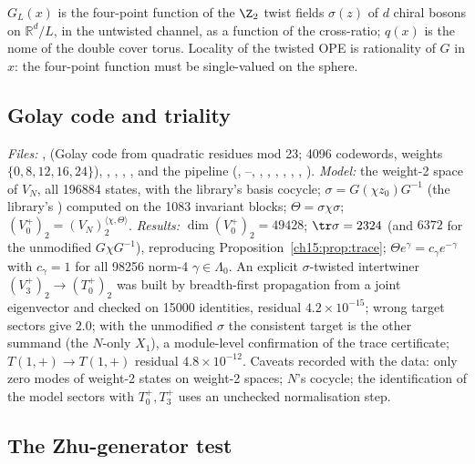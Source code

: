 \begin{physics}
$G_L(x)$ is the four-point function of the $\Z_2$ twist fields $\sigma(z)$ of $d$ chiral bosons
on $\mathbb{R}^d/L$, in the untwisted channel, as a function of the cross-ratio; $q(x)$ is the nome of the
double cover torus. Locality of the twisted OPE is rationality of $G$ in $x$: the four-point
function must be single-valued on the sphere.
\end{physics}

\subsection{Golay code and triality}\label{ch15:sec:num-triality}

\emph{Files:} ,  (Golay code from quadratic residues mod 23;
4096 codewords, weights $\{0,8,12,16,24\}$), , , ,
, and the pipeline  (, --,
, , , , , ,
). \emph{Model:} the weight-2 space of $V_N$, all 196884 states, with the library's
basis cocycle; $\sigma=G(\chi z_0)G^{-1}$ (the library's ) computed on the 1083
invariant blocks; $\Theta=\sigma\chi\sigma$; $(V_0^+)_2=(V_N)_2^{\langle\chi,\Theta\rangle}$. \emph{Results:}
$\dim(V_0^+)_2=49428$; $\tr\sigma=2324$ (and $6372$ for the unmodified $G\chi G^{-1}$),
reproducing Proposition~\ref{ch15:prop:trace}; $\Theta e^\gamma=c_\gamma e^{-\gamma}$ with $c_\gamma=1$ for
all 98256 norm-4 $\gamma\in\Lambda_0$. An explicit $\sigma$-twisted intertwiner $(V_3^+)_2\to(T_0^+)_2$
was built by breadth-first propagation from a joint eigenvector and checked on 15000 identities,
residual $4.2\times10^{-15}$; wrong target sectors give $2.0$; with the unmodified $\sigma$ the
consistent target is the other summand (the $N$-only $X_1$), a module-level confirmation of the
trace certificate; $T(1,+)\to T(1,+)$ residual $4.8\times10^{-12}$. Caveats recorded with the data:
only zero modes of weight-2 states on weight-2 spaces; $N$'s cocycle; the identification of the model
sectors with $T_0^+,T_3^+$ uses an unchecked normalisation step.

\subsection{The Zhu-generator test}\label{ch15:sec:num-zhu}

